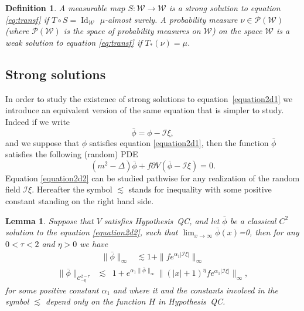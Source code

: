 \documentclass[a4paper,10pt]{article}
\newcommand{\asterisk}{\mathord{*}}
\newcommand{\tmem}[1]{{\em #1\/}}
\newcommand{\tmop}[1]{\ensuremath{\operatorname{#1}}}
\newtheorem{definition}{Definition}
\newtheorem{lemma}{Lemma}
\begin{document}
\begin{definition}
  \label{definition_solution}A measurable map $S : \mathcal{W} \rightarrow
  \mathcal{W}$ is a {\tmem{strong solution}} to equation {\eqref{eq:transf}}
  if $T \circ S = \tmop{Id}_{\mathcal{W}}$ $\mu$-almost surely. A probability
  measure $\nu \in \mathcal{P} (\mathcal{W})$ (where $\mathcal{P}
  (\mathcal{W})$ is the space of probability measures on $\mathcal{W}$) on the
  space $\mathcal{W}$ is a {\tmem{weak solution}} to equation
  {\eqref{eq:transf}} if $T_{\asterisk} (\nu) = \mu$.
\end{definition}

\subsection{Strong solutions}

In order to study the existence of strong solutions to
equation~{\eqref{equation2d1}} we introduce an equivalent version of the same
equation that is simpler to study. Indeed if we write
\[ \bar{\phi} = \phi -\mathcal{I} \xi, \]
and we suppose that $\phi$ satisfies equation {\eqref{equation2d1}}, then the
function $\bar{\phi}$ satisfies the following (random) PDE
\begin{equation}
  (m^2 - \Delta) \bar{\phi} + f \partial V (\bar{\phi} -\mathcal{I} \xi) = 0.
  \label{equation2d2}
\end{equation}
Equation {\eqref{equation2d2}} can be studied pathwise for any realization of
the random field $\mathcal{I} \xi$. Hereafter the symbol $\lesssim$ stands for
inequality with some positive constant standing on the right hand side.

\begin{lemma}
  \label{lemma_bound}Suppose that $V$ satisfies Hypothesis~QC, and let
  $\bar{\phi}$ be a classical $C^2$ solution to the equation
  {\eqref{equation2d2}}, such that $\lim_{x \rightarrow \infty} \bar{\phi}
  (x)$=0, then for any $0 < \tau < 2$ and $\eta > 0$ we have
  \begin{equation}
    \begin{array}{ll}
      \| \bar{\phi} \|_{\infty} & \lesssim 1 +\|f e^{\alpha_1 | \mathcal{I}
      \xi |} \|_{\infty} \label{equationexistence2d1}
    \end{array}
  \end{equation}
  \begin{equation}
    \begin{array}{lll}
      \| \bar{\phi} \|_{\mathcal{C}_{- \eta}^{2 - \tau}} & \lesssim & 1 +
      e^{\alpha_1 \| \bar{\phi} \|_{\infty}} \| (| x | + 1)^{\eta} f
      e^{\alpha_1 | \mathcal{I} \xi |} \|_{\infty},
    \end{array} \label{equationexistence2d2}
  \end{equation}
  for some positive constant $\alpha_1$ and where it and the constants
  involved in the symbol $\lesssim$ depend only on the function $H$ in
  Hypothesis~QC.
\end{lemma}
\end{document}
